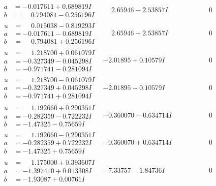 \documentclass[1p]{elsarticle_modified}
\theoremstyle{definition}
\begin{document}
$$\begin{array}{c|c|c}
\begin{aligned}
a &= -0.017611 + 0.689819 I \\
b &= \phantom{-}0.794081 - 0.256196 I\end{aligned}
 & \phantom{-}2.65946 - 2.53857 I & \phantom{-0.000000 } 0 \\ \hline\begin{aligned}
u &= \phantom{-}0.015038 - 0.819293 I \\
a &= -0.017611 - 0.689819 I \\
b &= \phantom{-}0.794081 + 0.256196 I\end{aligned}
 & \phantom{-}2.65946 + 2.53857 I & \phantom{-0.000000 } 0 \\ \hline\begin{aligned}
u &= \phantom{-}1.218700 + 0.061079 I \\
a &= -0.327349 - 0.045298 I \\
b &= -0.971741 - 0.281094 I\end{aligned}
 & -2.01895 + 0.10579 I & \phantom{-0.000000 } 0 \\ \hline\begin{aligned}
u &= \phantom{-}1.218700 - 0.061079 I \\
a &= -0.327349 + 0.045298 I \\
b &= -0.971741 + 0.281094 I\end{aligned}
 & -2.01895 - 0.10579 I & \phantom{-0.000000 } 0 \\ \hline\begin{aligned}
u &= \phantom{-}1.192660 + 0.290351 I \\
a &= -0.282359 - 0.722232 I \\
b &= -1.47325 - 0.75659 I\end{aligned}
 & -0.360070 - 0.634714 I & \phantom{-0.000000 } 0 \\ \hline\begin{aligned}
u &= \phantom{-}1.192660 - 0.290351 I \\
a &= -0.282359 + 0.722232 I \\
b &= -1.47325 + 0.75659 I\end{aligned}
 & -0.360070 + 0.634714 I & \phantom{-0.000000 } 0 \\ \hline\begin{aligned}
u &= \phantom{-}1.175000 + 0.393607 I \\
a &= -1.397410 + 0.013308 I \\
b &= -1.93087 + 0.00761 I\end{aligned}
 & -7.33757 - 1.84736 I & \phantom{-0.000000 } 0 \\ \hline\begin{aligned}

\end{aligned}
\end{array}$$
\end{document}
